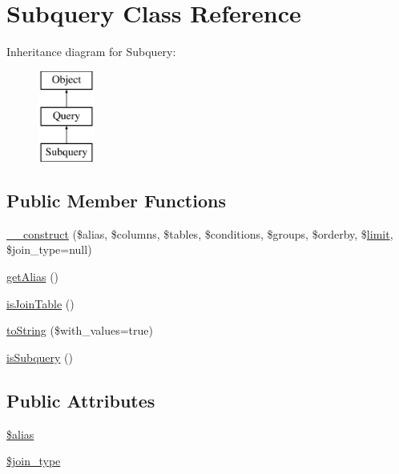 \hypertarget{classSubquery}{\section{Subquery Class Reference}
\label{classSubquery}
}
Inheritance diagram for Subquery\-:\begin{figure}[H]
\begin{center}
\leavevmode
\includegraphics[height=3.000000cm]{classSubquery}
\end{center}
\end{figure}
\subsection*{Public Member Functions}
\begin{DoxyCompactItemize}
\item 
\hyperlink{classSubquery_af29e00d9bcd8b4aeb17b36fd99293441}{\-\_\-\-\_\-construct} (\$alias, \$columns, \$tables, \$conditions, \$groups, \$orderby, \$\hyperlink{classQuery_af2e290d02d3e8c157f9b85b9da1ac08c}{limit}, \$join\-\_\-type=null)
\item 
\hyperlink{classSubquery_a6e48c79aecdeae3623d9b67b77e15a0e}{get\-Alias} ()
\item 
\hyperlink{classSubquery_a92a4ae32701020381a7725d625926260}{is\-Join\-Table} ()
\item 
\hyperlink{classSubquery_a3a5a5fe8693b68cb0b2745d75fe134fc}{to\-String} (\$with\-\_\-values=true)
\item 
\hyperlink{classSubquery_adea0bfe78ba0f6318fa9f181286e1482}{is\-Subquery} ()
\end{DoxyCompactItemize}
\subsection*{Public Attributes}
\begin{DoxyCompactItemize}
\item 
\hyperlink{classSubquery_a098cb0b2df506793d52ac6b29ca07dae}{\$alias}
\item 
\hyperlink{classSubquery_a20cab7ece0fb2ed4db3c5db11ed8ccc6}{\$join\-\_\-type}
\end{DoxyCompactItemize}


